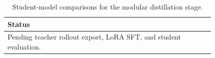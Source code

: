 \begin{table}[t]
\centering
\caption{Student-model comparisons for the modular distillation stage.}
\label{tab:student-results}
\begin{tabular}{p{0.82\linewidth}}
\hline
Status \\
\hline
Pending teacher rollout export, LoRA SFT, and student evaluation. \\
\hline
\end{tabular}
\end{table}
